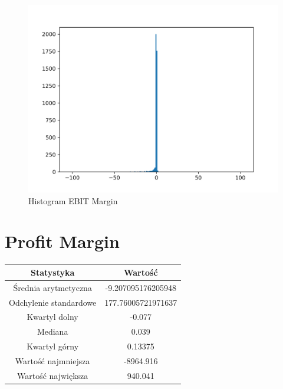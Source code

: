 \documentclass{article}
\begin{document}
\begin{figure}[h!]
    \includegraphics[width=\linewidth]{variables/EBIT Margin.png}
    \caption{Histogram EBIT Margin }
\end{figure}\section{ Profit Margin }

\begin{center}
    \begin{tabular}{|c | c|} 
    \hline
    Statystyka & Wartość \\
    \hline\hline
    Średnia arytmetyczna & -9.207095176205948 \\ 
    \hline
    Odchylenie standardowe & 177.76005721971637 \\
    \hline
    Kwartyl dolny & -0.077 \\
    \hline
    Mediana & 0.039 \\
    \hline
    Kwartyl górny & 0.13375 \\
    \hline
    Wartość najmniejsza & -8964.916 \\
    \hline
    Wartość największa & 940.041 \\
    \hline
   \end{tabular}
\end{center}
\end{document}
